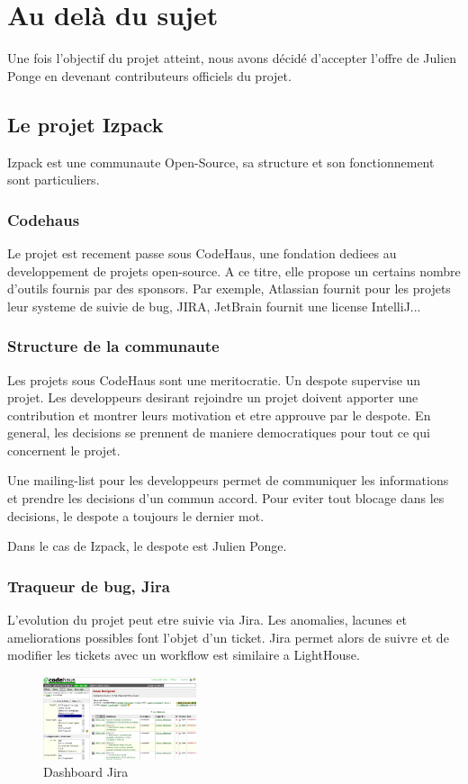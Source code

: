 \section{Au delà du sujet}
Une fois l'objectif du projet atteint, nous avons décidé d'accepter l'offre de Julien Ponge en devenant contributeurs officiels du projet. 
\subsection{Le projet Izpack}
Izpack est une communaute Open-Source, sa structure et son fonctionnement sont particuliers.
\subsubsection{Codehaus}
Le projet est recement passe sous CodeHaus, une fondation dediees au developpement de projets open-source. A ce titre, elle propose un certains nombre d'outils fournis par des sponsors. Par exemple, Atlassian fournit pour les projets leur systeme de suivie de bug, JIRA, JetBrain fournit une license IntelliJ...
\subsubsection{Structure de la communaute}
Les projets sous CodeHaus sont une meritocratie. Un despote supervise un projet. Les developpeurs desirant rejoindre un projet doivent apporter une contribution et montrer leurs motivation et etre approuve par le despote. En general, les decisions se prennent de maniere democratiques pour tout ce qui concernent le projet.

Une mailing-list pour les developpeurs permet de communiquer les informations et prendre les decisions d'un  commun accord. Pour eviter tout blocage dans les decisions, le despote a toujours le dernier mot.

Dans le cas de Izpack, le despote est Julien Ponge.
\subsubsection{Traqueur de bug, Jira}
L'evolution du projet peut etre suivie via Jira. Les anomalies, lacunes et ameliorations possibles font l'objet d'un ticket. Jira permet alors de suivre et de modifier les tickets avec un workflow est similaire a LightHouse.
\begin{figure}[H]
	\centering
	\includegraphics[width=0.4\textwidth]{../image/jira.png}
	\caption{Dashboard Jira}
\end{figure}
